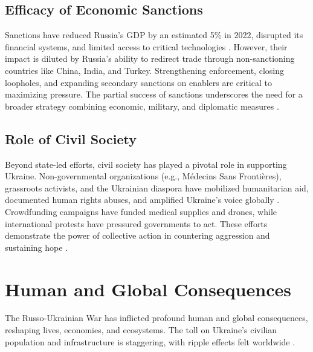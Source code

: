 \documentclass[a4paper,12pt]{article}
\begin{document}
\subsection{Efficacy of Economic Sanctions}
Sanctions have reduced Russia’s GDP by an estimated 5\% in 2022, disrupted its financial systems, and limited access to critical technologies \cite{imf_2023}. However, their impact is diluted by Russia’s ability to redirect trade through non-sanctioning countries like China, India, and Turkey. Strengthening enforcement, closing loopholes, and expanding secondary sanctions on enablers are critical to maximizing pressure. The partial success of sanctions underscores the need for a broader strategy combining economic, military, and diplomatic measures \cite{osce_2023}.

\subsection{Role of Civil Society}
Beyond state-led efforts, civil society has played a pivotal role in supporting Ukraine. Non-governmental organizations (e.g., Médecins Sans Frontières), grassroots activists, and the Ukrainian diaspora have mobilized humanitarian aid, documented human rights abuses, and amplified Ukraine’s voice globally \cite{un_2023}. Crowdfunding campaigns have funded medical supplies and drones, while international protests have pressured governments to act. These efforts demonstrate the power of collective action in countering aggression and sustaining hope \cite{unhcr_2023}.

\section{Human and Global Consequences}
The Russo-Ukrainian War has inflicted profound human and global consequences, reshaping lives, economies, and ecosystems. The toll on Ukraine’s civilian population and infrastructure is staggering, with ripple effects felt worldwide \cite{un_2023, eco_impact_2023}.
\end{document}
